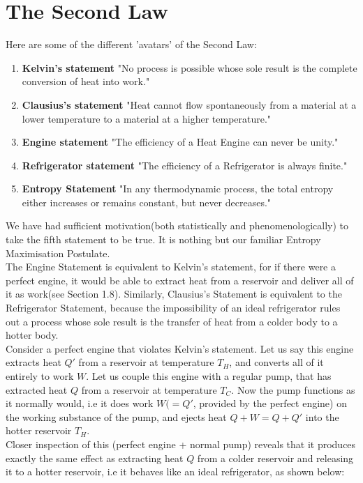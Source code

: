 \documentclass[oneside]{book}
\begin{document}
\section{The Second Law}
Here are some of the different 'avatars' of the Second Law:
\begin{enumerate}
\item \textbf{Kelvin’s statement} "No process is possible whose sole result is the complete conversion of heat into work."
\item \textbf{Clausius’s statement} "Heat cannot flow spontaneously from a material at a lower temperature to a material at a higher temperature."
\item \textbf{Engine statement} "The efficiency of a Heat Engine can never be unity."
\item \textbf{Refrigerator statement} "The efficiency of a Refrigerator is always finite."
\item \textbf{Entropy Statement} "In any thermodynamic process, the total entropy either increases or remains constant, but never decreases."
\end{enumerate}

We have had sufficient motivation(both statistically and phenomenologically) to take the fifth statement to be true. It is nothing but our familiar Entropy Maximisation Postulate.\\

The Engine Statement is equivalent to Kelvin's statement, for if there were a perfect engine, it would be able to extract heat from a reservoir and deliver all of it as work(see Section 1.8). Similarly, Clausius's Statement is equivalent to the Refrigerator Statement, because the impossibility of an ideal refrigerator rules out a process whose sole result is the transfer of heat from a colder body to a hotter body.\\

Consider a perfect engine that violates Kelvin's statement. Let us say this engine extracts heat $Q'$ from a reservoir at temperature $T_H$, and converts all of it entirely to work $W$. Let us couple this engine with a regular pump, that has extracted heat $Q$ from a reservoir at temperature $T_C$. Now the pump functions as it normally would, i.e it does work $W(=Q'$, provided by the perfect engine) on the working substance of the pump, and ejects heat $Q+W = Q+Q'$ into the hotter reservoir $T_H$.\\

Closer inspection of this (perfect engine + normal pump) reveals that it produces exactly the same effect as extracting heat $Q$ from a colder reservoir and releasing it to a hotter reservoir, i.e it behaves like an ideal refrigerator, as shown below:
\end{document}
